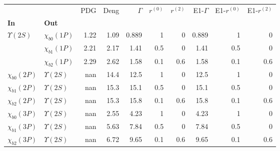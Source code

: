 \begin{tabular}{l|l|r|r|r|r|r|r|r|r}
\toprule
                &                &  PDG &  Deng &  $\Gamma$ &  $r^{(0)}$ &  $r^{(2)}$ &  E1-$\Gamma$ &  E1-$r^{(0)}$ &  E1-$r^{(2)}$ \\
\textbf{In} & \textbf{Out} &      &       &           &            &            &              &               &               \\
\midrule
\textbf{$\Upsilon(2S)$} & \textbf{$\chi_{b0}(1P)$} & 1.22 &  1.09 &     0.889 &          1 &          0 &        0.889 &             1 &             0 \\
                & \textbf{$\chi_{b1}(1P)$} & 2.21 &  2.17 &      1.41 &        0.5 &          0 &         1.41 &           0.5 &             0 \\
                & \textbf{$\chi_{b2}(1P)$} & 2.29 &  2.62 &      1.58 &        0.1 &        0.6 &         1.58 &           0.1 &           0.6 \\
\textbf{$\chi_{b0}(2P)$} & \textbf{$\Upsilon(2S)$} &  nan &  14.4 &      12.5 &          1 &          0 &         12.5 &             1 &             0 \\
\textbf{$\chi_{b1}(2P)$} & \textbf{$\Upsilon(2S)$} &  nan &  15.3 &      15.1 &        0.5 &          0 &         15.1 &           0.5 &             0 \\
\textbf{$\chi_{b2}(2P)$} & \textbf{$\Upsilon(2S)$} &  nan &  15.3 &      15.8 &        0.1 &        0.6 &         15.8 &           0.1 &           0.6 \\
\textbf{$\chi_{b0}(3P)$} & \textbf{$\Upsilon(2S)$} &  nan &  2.55 &      4.23 &          1 &          0 &         4.23 &             1 &             0 \\
\textbf{$\chi_{b1}(3P)$} & \textbf{$\Upsilon(2S)$} &  nan &  5.63 &      7.84 &        0.5 &          0 &         7.84 &           0.5 &             0 \\
\textbf{$\chi_{b2}(3P)$} & \textbf{$\Upsilon(2S)$} &  nan &  6.72 &      9.65 &        0.1 &        0.6 &         9.65 &           0.1 &           0.6 \\
\bottomrule
\end{tabular}
